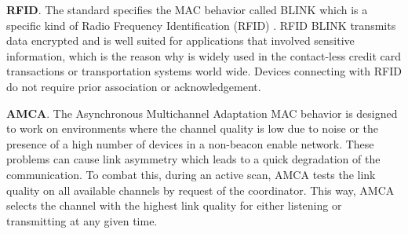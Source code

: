 \documentclass[conference]{IEEEtran}
\begin{document}
\textbf{RFID}. The standard specifies the MAC behavior called BLINK which is a specific kind of Radio Frequency Identification (RFID) \cite{isostd}. RFID BLINK transmits data encrypted and is well suited for applications that involved sensitive information, which is the reason why is widely used in the contact-less credit card transactions or transportation systems world wide. Devices connecting with RFID do not require prior association or acknowledgement. 

\textbf{AMCA}. The Asynchronous Multichannel Adaptation MAC behavior is designed to work on environments where the channel quality is low due to noise or the presence of a high number of devices in a non-beacon enable network. These problems can cause link asymmetry which leads to a quick degradation of the communication. To combat this, during an active scan, AMCA tests the link quality on all available channels by request of the coordinator. This way, AMCA selects the channel with the highest link quality for either listening or transmitting at any given time.
\end{document}
